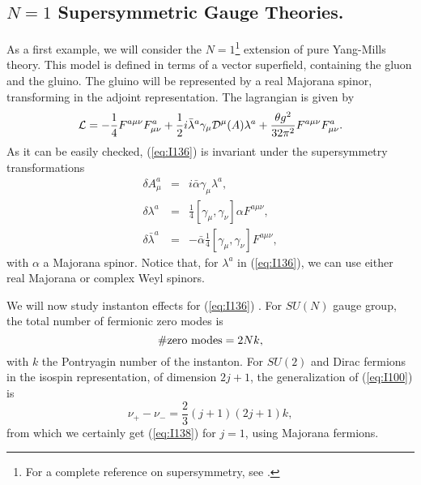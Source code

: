 \subsection{$N\!=\!1$ Supersymmetric Gauge
Theories.}

As a first example, we will consider the $N\!=\!1$\footnote{For a complete reference on supersymmetry, see
\cite{WB}.} extension
of pure Yang-Mills theory. This model is defined in terms of a
vector superfield, containing the gluon and the gluino. The
gluino will be represented by a real Majorana spinor,
transforming in the adjoint representation. The lagrangian is
given by
\begin{equation}
{\cal L} = - \frac {1}{4} F^{a \mu \nu} F^{a}_{\mu \nu} + 
\frac {1}{2} i \bar{\lambda}^{a} \gamma_{\mu} {\cal D}^{\mu}(A)
\lambda^{a} + \frac {\theta g^2}{32 \pi^2} F^{a \mu
\nu}F^{a}_{\mu \nu}.
\label{eq:I136}
\end{equation}
As it can be easily checked, (\ref{eq:I136}) is invariant under
the supersymmetry transformations
\begin{eqnarray}
\delta A_{\mu}^{a} & = & i \bar{\alpha} \gamma_{\mu} \lambda^{a},
\nonumber \\
\delta \lambda^{a} & = & \frac
{1}{4}[\gamma_{\mu},\gamma_{\nu}]\alpha F^{a \mu \nu}, \nonumber
\\
\delta \bar{\lambda}^{a} & = & - \bar{\alpha} \frac {1}{4}
[\gamma_{\mu},\gamma_{\nu}] F^{a \mu \nu},
\label{eq:I137}
\end{eqnarray}
with $\alpha$ a Majorana spinor. Notice that, for $\lambda^{a}$ in
(\ref{eq:I136}), we can use either real Majorana or complex Weyl
spinors.
  
We will now study instanton effects for (\ref{eq:I136}) \cite{NSVZ,SVZ1,SVZ2,A,ADS1,ADS2}. For
$SU(N)$ gauge group, the total number of fermionic zero modes is 
\begin{equation}
\# \hbox {zero modes} = 2 Nk, 
\label{eq:I138}
\end{equation}
with $k$ the Pontryagin number of the instanton. For $SU(2)$
and Dirac fermions in the isospin representation, of dimension
$2j+1$, the generalization of (\ref{eq:I100}) is
\begin{equation}
\nu_+ -\nu_- = \frac {2}{3} (j+1)(2j+1)k,
\label{eq:I139}
\end{equation}
from which we certainly get (\ref{eq:I138}) for $j=1$, using Majorana
fermions.
  
